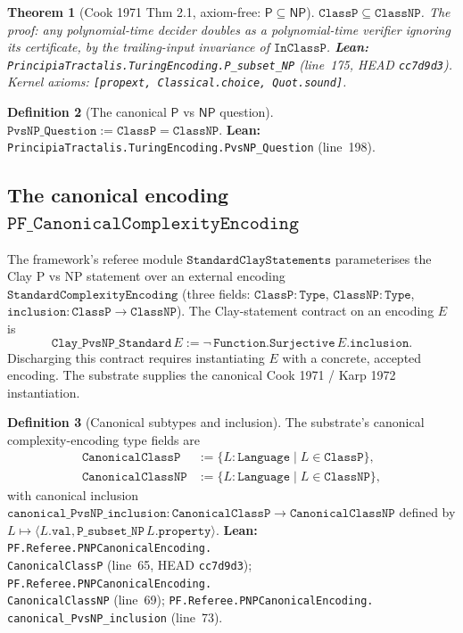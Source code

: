 \documentclass[11pt,a4paper]{article}
\theoremstyle{plain}
\newtheorem{theorem}{Theorem}[section]
\theoremstyle{definition}
\newtheorem{definition}[theorem]{Definition}
\begin{document}
\begin{theorem}[Cook 1971 Thm 2.1, axiom-free: $\mathsf{P} \subseteq
\mathsf{NP}$]
\label{thm:p-subset-np}
$\mathtt{ClassP} \subseteq \mathtt{ClassNP}$. The proof: any
polynomial-time decider doubles as a polynomial-time verifier ignoring
its certificate, by the trailing-input invariance of $\mathtt{InClassP}$.
\textbf{Lean:}
\texttt{PrincipiaTractalis.TuringEncoding.P\_subset\_NP}
(line~175, HEAD \texttt{cc7d9d3}). Kernel axioms:
\texttt{[propext, Classical.choice, Quot.sound]}.
\end{theorem}

\begin{definition}[The canonical $\mathsf{P}$ vs $\mathsf{NP}$ question]
\label{def:pvsnp-question}
$\mathtt{PvsNP\_Question} := \mathtt{ClassP} = \mathtt{ClassNP}$.
\textbf{Lean:}
\texttt{PrincipiaTractalis.TuringEncoding.PvsNP\_Question}
(line~198).
\end{definition}

\subsection{The canonical encoding
$\mathtt{PF\_CanonicalComplexityEncoding}$}
\label{sec:pf-canonical-enc}

The framework's referee module $\mathtt{StandardClayStatements}$
parameterises the Clay P vs NP statement over an external
encoding $\mathtt{StandardComplexityEncoding}$ (three fields:
$\mathtt{ClassP : Type}$, $\mathtt{ClassNP : Type}$, $\mathtt{inclusion
: ClassP \to ClassNP}$). The Clay-statement contract on an encoding
$E$ is
\[
\mathtt{Clay\_PvsNP\_Standard}\, E := \neg\,
\mathtt{Function.Surjective}\, E.\mathtt{inclusion}.
\]
Discharging this contract requires instantiating $E$ with a concrete,
accepted encoding. The substrate supplies the canonical Cook 1971 /
Karp 1972 instantiation.

\begin{definition}[Canonical subtypes and inclusion]
\label{def:canonical-types}
The substrate's canonical complexity-encoding type fields are
\begin{align*}
\mathtt{CanonicalClassP} &:= \{ L : \mathtt{Language} \mid L \in
\mathtt{ClassP} \}, \\
\mathtt{CanonicalClassNP} &:= \{ L : \mathtt{Language} \mid L \in
\mathtt{ClassNP} \},
\end{align*}
with canonical inclusion $\mathtt{canonical\_PvsNP\_inclusion}
: \mathtt{CanonicalClassP} \to \mathtt{CanonicalClassNP}$ defined by
$L \mapsto \langle L.\mathtt{val}, \mathtt{P\_subset\_NP}\,
L.\mathtt{property}\rangle$.
\textbf{Lean:}
\texttt{PF.Referee.PNPCanonicalEncoding.\\
CanonicalClassP}
(line~65, HEAD \texttt{cc7d9d3});
\texttt{PF.Referee.PNPCanonicalEncoding.\\
CanonicalClassNP}
(line~69);
\texttt{PF.Referee.PNPCanonicalEncoding.\\
canonical\_PvsNP\_inclusion}
(line~73).
\end{definition}
\end{document}
